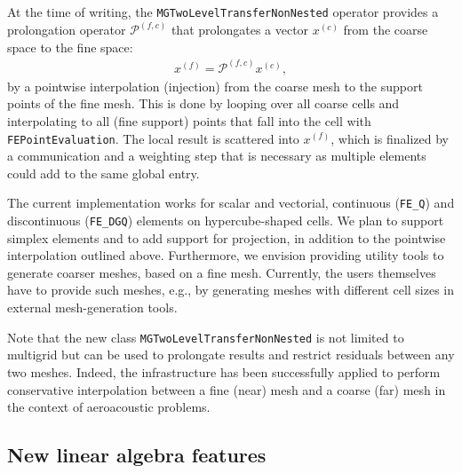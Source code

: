\documentclass{ansarticle-preprint}
\begin{document}
At the time of writing, the \texttt{MGTwoLevelTransferNonNested} operator provides a prolongation operator $\mathcal{P}^{(f,c)}$
that prolongates a vector $x^{(c)}$ from the coarse space to the fine space:
\begin{align*}
x^{(f)} = \mathcal{P}^{(f, c)}  x^{(c)},
\end{align*}
by a pointwise interpolation (injection) from the coarse mesh to the support points of the fine mesh. This is done
by looping over all coarse cells and interpolating to all (fine support) points that fall into the cell with
\texttt{FEPointEvaluation}. The local result is scattered into $x^{(f)}$, which is finalized by a
communication and a weighting step that is necessary as multiple elements could add to the same global entry.


The current implementation works for scalar and vectorial, continuous (\texttt{FE\_Q})
and discontinuous (\texttt{FE\_DGQ}) elements on hypercube-shaped cells. We plan to support
simplex elements and to add support
for projection, in addition to the pointwise interpolation outlined
above. Furthermore, we envision providing utility tools to generate
coarser
meshes, based on a fine mesh. Currently, the users themselves
have to provide such meshes,
e.g., by generating meshes with different cell sizes in external mesh-generation tools.

Note that the new class \texttt{MGTwoLevelTransferNonNested} is not limited to
multigrid but can be used to prolongate results and restrict residuals between any
two meshes. Indeed, the infrastructure has been successfully applied to perform
conservative interpolation between a fine (near) mesh and a coarse (far) mesh in the
context of aeroacoustic problems.


\subsection{New linear algebra features}\label{sec:lac}
\end{document}
